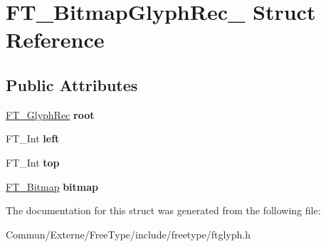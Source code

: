 \hypertarget{struct_f_t___bitmap_glyph_rec__}{}\section{F\+T\+\_\+\+Bitmap\+Glyph\+Rec\+\_\+ Struct Reference}
\label{struct_f_t___bitmap_glyph_rec__}
\subsection*{Public Attributes}
\begin{DoxyCompactItemize}
\item 
\hyperlink{struct_f_t___glyph_rec__}{F\+T\+\_\+\+Glyph\+Rec} {\bfseries root}\hypertarget{struct_f_t___bitmap_glyph_rec___ac3970353fbc0fe3d4c59c3fd608140f3}{}\label{struct_f_t___bitmap_glyph_rec___ac3970353fbc0fe3d4c59c3fd608140f3}

\item 
F\+T\+\_\+\+Int {\bfseries left}\hypertarget{struct_f_t___bitmap_glyph_rec___a6cfd2d89af7b6be4af886047c9cb7e0a}{}\label{struct_f_t___bitmap_glyph_rec___a6cfd2d89af7b6be4af886047c9cb7e0a}

\item 
F\+T\+\_\+\+Int {\bfseries top}\hypertarget{struct_f_t___bitmap_glyph_rec___a25fc81296678d6a2d064843c01bc05f7}{}\label{struct_f_t___bitmap_glyph_rec___a25fc81296678d6a2d064843c01bc05f7}

\item 
\hyperlink{struct_f_t___bitmap__}{F\+T\+\_\+\+Bitmap} {\bfseries bitmap}\hypertarget{struct_f_t___bitmap_glyph_rec___a16ecd0725920f8d5ad4c14e9448126ad}{}\label{struct_f_t___bitmap_glyph_rec___a16ecd0725920f8d5ad4c14e9448126ad}

\end{DoxyCompactItemize}


The documentation for this struct was generated from the following file\+:\begin{DoxyCompactItemize}
\item 
Commun/\+Externe/\+Free\+Type/include/freetype/ftglyph.\+h\end{DoxyCompactItemize}
